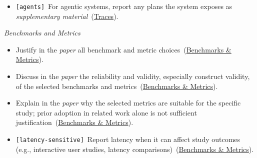 \documentclass[smallextended]{svjour3}
\makeatletter
\newcommand{\must}{\textbf{must}\xspace}
\newcommand{\mustnot}{\textbf{must not}\xspace}
\newcommand{\should}{\textbf{should}\xspace}
\newcommand{\paper}{\emph{paper}\xspace}
\newcommand{\supplementarymaterial}{\emph{supplementary material}\xspace}
\newcommand{\paper}{\emph{paper}\xspace}
\newcommand{\supplementarymaterial}{\emph{supplementary material}\xspace}
\newcommand{\iconM}{\usebox{\iconMbox}\xspace}
\newcommand{\iconS}{\usebox{\iconSbox}\xspace}
\newcommand{\iconM}{●\xspace}
\newcommand{\iconS}{○\xspace}
\newcommand{\condition}[1]{\texttt{\small[#1]}\,}
\newcommand{\condition}[1]{@@cond:#1@@}
\newcommand{\llmusage}{\hyperref[sec:studying-llm-usage-in-software-engineering]{\mbox{\emph{Studying LLM Usage}}}\xspace}
\newcommand{\benchmarkingtasks}{\hyperref[sec:benchmarking-llms-for-software-engineering-tasks]{\mbox{\emph{Benchmarking LLMs}}}\xspace}
\newcommand{\llmusage}{\href{/study-types/usage/}{\emph{Studying LLM Usage}}\xspace}
\newcommand{\benchmarkingtasks}{\href{/study-types/benchmarking/}{\emph{Benchmarking LLMs}}\xspace}
\newcommand{\limitationsmitigations}{\hyperref[sec:report-limitations-and-mitigations]{\emph{Limitations and Mitigations}}\xspace}
\newcommand{\reftraces}{\hyperref[sec:report-session-traces]{Traces}}
\newcommand{\refbenchmarks}{\hyperref[sec:use-suitable-baselines-benchmarks-and-metrics]{Benchmarks \& Metrics}}
\newcommand{\limitationsmitigations}{\href{/guidelines/limitations/}{\emph{Limitations and Mitigations}}\xspace}
\newcommand{\reftraces}{\href{/guidelines/traces/}{Traces}}
\newcommand{\refbenchmarks}{\href{/guidelines/benchmarks-metrics/}{Benchmarks \& Metrics}}
\makeatother
\begin{document}
\begin{appendices}
\begin{itemize}[label={},leftmargin=*]
    \item \iconS \condition{agents} For agentic systems, report any plans the system exposes as \supplementarymaterial~(\reftraces).
\end{itemize}

\noindent\textit{Benchmarks and Metrics}
\begin{itemize}[label={},leftmargin=*]
    \item \iconM Justify in the \paper all benchmark and metric choices~(\refbenchmarks).
    \item \iconM Discuss in the \paper the reliability and validity, especially construct validity, of the selected benchmarks and metrics~(\refbenchmarks).
    \item \iconM Explain in the \paper why the selected metrics are suitable for the specific study; prior adoption in related work alone is not sufficient justification~(\refbenchmarks).
    \item \iconM \condition{latency-sensitive} Report latency when it can affect study outcomes (e.g., interactive user studies, latency comparisons)~(\refbenchmarks).

\end{itemize}
\end{appendices}
\end{document}
